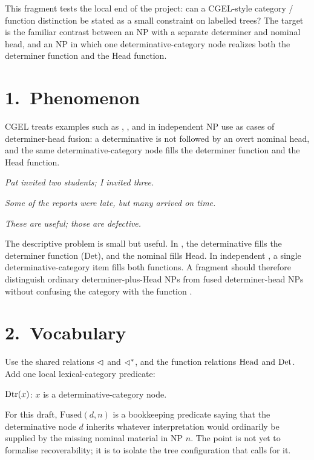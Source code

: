 \documentclass[11pt]{article}
\newcommand{\Dtr}{\Cat{Dtr}}
\newcommand{\Fused}{\mathrm{Fused}}
\begin{document}
\fragmenthead

\noindent
This fragment tests the local end of the project: can a CGEL-style category /
function distinction be stated as a small constraint on labelled trees? The
target is the familiar contrast between an NP with a separate determiner and
nominal head, and an NP in which one determinative-category node realizes both
the determiner function and the Head function.

\section*{1.~Phenomenon}

CGEL treats examples such as , , and
 in independent NP use as cases of determiner-head fusion:
a determinative is not followed by an overt nominal head, and the same
determinative-category node fills the determiner function and the Head
function.

\ea
\textit{Pat invited two students; I invited three.}
\z

\ea
\textit{Some of the reports were late, but many arrived on time.}
\z

\ea
\textit{These are useful; those are defective.}
\z

The descriptive problem is small but useful. In , the
determinative  fills the determiner function (Det), and the
nominal  fills Head. In independent , a
single determinative-category item fills both functions. A fragment should
therefore distinguish ordinary determiner-plus-Head NPs from fused
determiner-head NPs without confusing the category  with
the function .

\section*{2.~Vocabulary}

Use the shared relations $\mathrel{\lhd}$ and $\mathrel{\lhd^{*}}$, and the function relations
$\mathrm{Head}$ and $\mathrm{Det}$. Add one local lexical-category predicate:

\ea
$\Dtr(x)$: $x$ is a determinative-category node.
\z

For this draft, $\Fused(d,n)$ is a bookkeeping predicate saying that the
determinative node $d$ inherits whatever interpretation would ordinarily be
supplied by the missing nominal material in NP $n$. The point is not yet to
formalise recoverability; it is to isolate the tree configuration that calls
for it.
\end{document}
